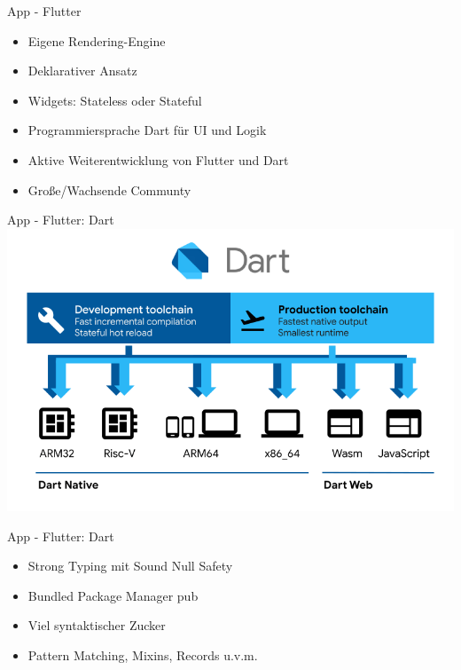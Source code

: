 \begin{frame}{App - Flutter}
	\centering
	\begin{itemize}
		\item Eigene Rendering-Engine
		\item Deklarativer Ansatz
		\item Widgets: Stateless oder Stateful
		\item Programmiersprache Dart für UI und Logik
		\item Aktive Weiterentwicklung von Flutter und Dart
		\item Große/Wachsende Communty
	\end{itemize}
\end{frame}

\begin{frame}{App - Flutter: Dart}
	\centering
	\includegraphics[height=1.0\textheight]{images/app/flutter/dart-diagram-small}
	\cite{darttoolchains}
\end{frame}

\begin{frame}{App - Flutter: Dart}
	\centering
	\begin{itemize}
		\item Strong Typing mit Sound Null Safety
		\item Bundled Package Manager pub
		\item Viel syntaktischer Zucker
		\item Pattern Matching, Mixins, Records u.v.m.
	\end{itemize}
\end{frame}

